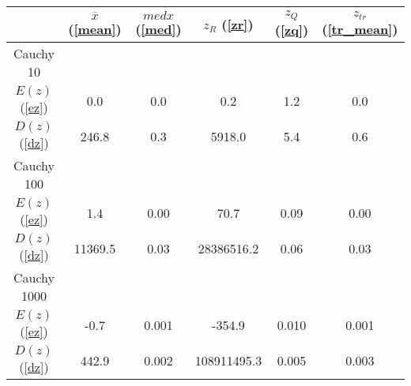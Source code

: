 \begin{tabular}{|c|c|c|c|c|c|}
\hline
 & $\overline{x}$ (\ref{mean}) & $med x$ (\ref{med}) & $z_R$ (\ref{zr}) & $z_Q$ (\ref{zq}) & $z_{tr}$ (\ref{tr_mean})\\
\hline
Cauchy 10 &  &  &  &  & \\
\hline
$E(z)$ (\ref{ez}) & 0.0 & 0.0 & 0.2 & 1.2 & 0.0\\
\hline
$D(z)$ (\ref{dz}) & 246.8 & 0.3 & 5918.0 & 5.4 & 0.6\\
\hline
Cauchy 100 &  &  &  &  & \\
\hline
$E(z)$ (\ref{ez}) & 1.4 & 0.00 & 70.7 & 0.09 & 0.00\\
\hline
$D(z)$ (\ref{dz}) & 11369.5 & 0.03 & 28386516.2 & 0.06 & 0.03\\
\hline
Cauchy 1000 &  &  &  &  & \\
\hline
$E(z)$ (\ref{ez}) & -0.7 & 0.001 & -354.9 & 0.010 & 0.001\\
\hline
$D(z)$ (\ref{dz}) & 442.9 & 0.002 & 108911495.3 & 0.005 & 0.003\\
\hline
\end{tabular}

